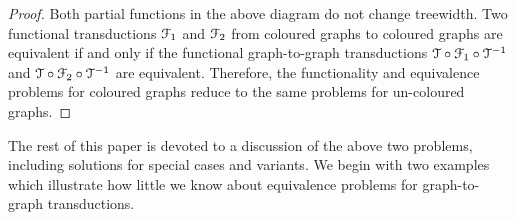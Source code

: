 \begin{proof}
    Both partial functions in the above diagram do not change treewidth. 
    Two functional \mso transductions ${\mathcal F}_1$ and ${\mathcal F}_2$  from coloured graphs to coloured graphs are equivalent if and only if the functional graph-to-graph \mso transductions  ${\mathcal T} \circ {\mathcal F}_1 \circ {\mathcal T}^{-1}$ and ${\mathcal T} \circ {\mathcal F}_2 \circ {\mathcal T}^{-1}$ are equivalent. 
     Therefore, the functionality and equivalence problems for coloured graphs reduce to the same problems for un-coloured graphs.
\end{proof}

The rest of this paper is devoted to a discussion of the above two problems, including solutions for special cases and variants.%
 We begin with two examples which illustrate how little we know about equivalence problems for graph-to-graph transductions.



